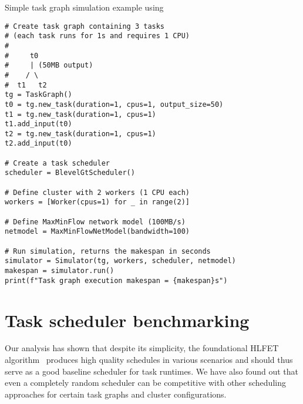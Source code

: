 \begin{listing}
	\caption{Simple task graph simulation example using \estee{}}
	\label{lst:estee-example}
\begin{verbatim}
# Create task graph containing 3 tasks
# (each task runs for 1s and requires 1 CPU)
#
#     t0
#     | (50MB output)
#    / \
#  t1   t2
tg = TaskGraph()
t0 = tg.new_task(duration=1, cpus=1, output_size=50)
t1 = tg.new_task(duration=1, cpus=1)
t1.add_input(t0)
t2 = tg.new_task(duration=1, cpus=1)
t2.add_input(t0)

# Create a task scheduler
scheduler = BlevelGtScheduler()

# Define cluster with 2 workers (1 CPU each)
workers = [Worker(cpus=1) for _ in range(2)]

# Define MaxMinFlow network model (100MB/s)
netmodel = MaxMinFlowNetModel(bandwidth=100)

# Run simulation, returns the makespan in seconds
simulator = Simulator(tg, workers, scheduler, netmodel)
makespan = simulator.run()
print(f"Task graph execution makespan = {makespan}s")
\end{verbatim}
\end{listing}


\section{Task scheduler benchmarking}
\label{sec:estee-benchmarks}
Our analysis has shown that despite its simplicity, the foundational HLFET
algorithm~\cite{hlfet1974} produces high quality schedules in various scenarios and should
thus serve as a good baseline scheduler for task runtimes. We have also found out that even a
completely random scheduler can be competitive with other scheduling approaches for certain task
graphs and cluster configurations.



